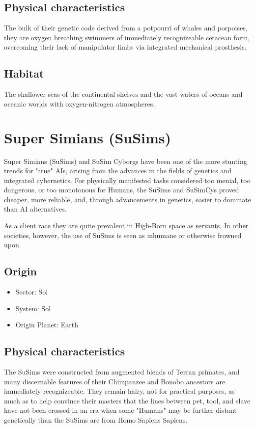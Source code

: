 \subsection{Physical characteristics}
The bulk of their genetic code derived from a potpourri of whales and
porpoises, they are oxygen breathing swimmers of immediately
recognizeable cetacean form, overcoming their lack of manipulator
limbs via integrated mechanical prosthesis.

\subsection{Habitat}
The shallower seas of the continental shelves and the vast waters of
oceans and oceanic worlds with oxygen-nitrogen atmospheres.

\section{Super Simians (SuSims)}

Super Simians (SuSims) and SuSim Cyborgs have been one of the more
stunting trends for "true" AIs, arising from the advances in the
fields of genetics and integrated cybernetics. For physically
manifested tasks considered too menial, too dangerous, or too
monotonous for Humans, the SuSims and SuSimCys proved cheaper, more
reliable, and, through advancements in genetics, easier to dominate
than AI alternatives.

As a client race they are quite prevalent in High-Born space as
servants. In other societies, however, the use of SuSims is seen as
inhumane or otherwise frowned upon.

\subsection{Origin}
\begin{itemize}
\item Sector: Sol
\item System: Sol
\item Origin Planet: Earth
\end{itemize}

\subsection{Physical characteristics}

The SuSims were constructed from augmented blends of Terran primates,
and many discernable features of their Chimpanzee and Bonobo ancestors
are immediately recognizeable. They remain hairy, not for practical
purposes, as much as to help convince their masters that the lines
between pet, tool, and slave have not been crossed in an era when some
"Humans" may be further distant genetically than the SuSims are from
Homo Sapiens Sapiens.

